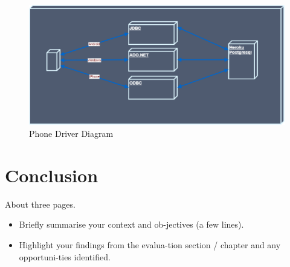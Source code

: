 \begin{figure}
	\includegraphics{img/connection-diagram.png}
	\caption{Phone Driver Diagram}
\end{figure}
\chapter{Conclusion}
About three pages.

\begin{itemize}
\item Briefly summarise your context and ob-jectives (a few lines).
\item Highlight your findings from the evalua-tion section / chapter and any opportuni-ties identified.
\end{itemize}

